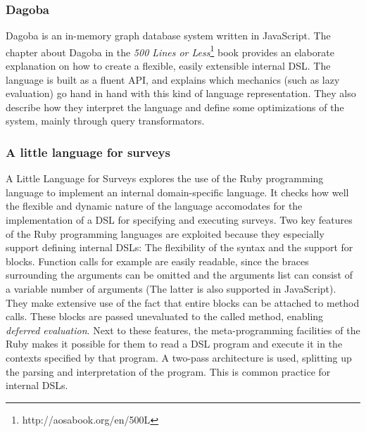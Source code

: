 \subsubsection*{Dagoba}

Dagoba is an in-memory graph database system written in JavaScript. The chapter about Dagoba in the \textit{500 Lines or Less}\footnote{http://aosabook.org/en/500L} book provides an elaborate explanation on how to create a flexible, easily extensible internal DSL. The language is built as a fluent API, and explains which mechanics (such as lazy evaluation) go hand in hand with this kind of language representation. They also describe how they interpret the language and define some optimizations of the system, mainly through query transformators.

\subsubsection*{A little language for surveys}

A Little Language for Surveys \cite{RubyDSL} explores the use of the Ruby programming language to implement an internal domain-specific language. It checks how well the flexible and dynamic nature of the language accomodates for the implementation of a DSL for specifying and executing surveys. Two key features of the Ruby programming languages are exploited because they especially support defining internal DSLs: The flexibility of the syntax and the support for blocks. Function calls for example are easily readable, since the braces surrounding the arguments can be omitted and the arguments list can consist of a variable number of arguments (The latter is also supported in JavaScript\cite{Ecma6}). They make extensive use of the fact that entire blocks can be attached to method calls. These blocks are passed unevaluated to the called method, enabling \textit{deferred evaluation}. Next to these features, the meta-programming facilities of the Ruby makes it possible for them to read a DSL program and execute it in the contexts specified by that program. A two-pass architecture is used, splitting up the parsing and interpretation of the program. This is common practice for internal DSLs.

%


